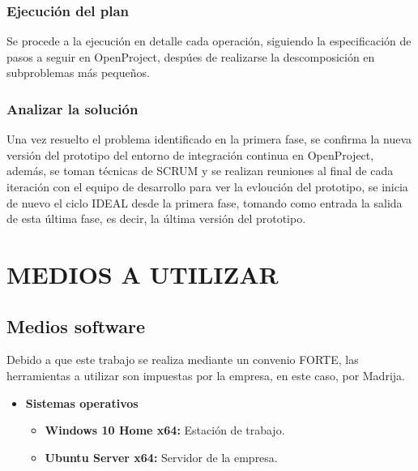 \documentclass{pre-tfg}
\begin{document}
\subsubsection{Ejecución del plan}

Se procede a la ejecución en detalle cada operación, siguiendo la especificación de pasos a seguir en OpenProject, despúes de realizarse la descomposición en subproblemas más pequeños.

\subsubsection{Analizar la solución}

Una vez resuelto el problema identificado en la primera fase, se confirma la nueva versión del prototipo del entorno de integración continua en OpenProject, además, se toman técnicas de SCRUM y se realizan reuniones al final de cada iteración con el equipo de desarrollo para ver la evloución del prototipo, se inicia de nuevo el ciclo IDEAL desde la primera fase, tomando como entrada la salida de esta última fase, es decir, la última versión del prototipo.

\section{MEDIOS A UTILIZAR}
\subsection{Medios software}

Debido a que este trabajo se realiza mediante un convenio FORTE, las herramientas a utilizar son impuestas por la empresa, en este caso, por Madrija.
\\

\begin{itemize}
\item \textbf{Sistemas operativos}
\begin{itemize}
\item \textbf{Windows 10 Home x64: }Estación de trabajo.
\item \textbf{Ubuntu Server x64: }Servidor de la empresa.
\end{itemize}
\end{itemize}
\end{document}
